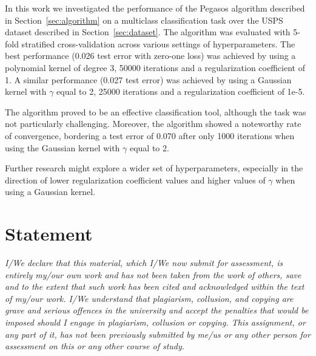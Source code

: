 \documentclass[runningheads]{llncs}
\begin{document}
In this work we investigated the performance of the Pegasos algorithm described in Section~\ref{sec:algorithm} on a multiclass classification task over the USPS dataset described in Section~\ref{sec:dataset}. The algorithm was evaluated with 5-fold stratified cross-validation across various settings of hyperparameters. The best performance (0.026 test error with zero-one loss) was achieved by using a polynomial kernel of degree 3, 50000 iterations and a regularization coefficient of 1. A similar performance (0.027 test error) was achieved by using a Gaussian kernel with $\gamma$ equal to 2, 25000 iterations and a regularization coefficient of 1e-5.

The algorithm proved to be an effective classification tool, although the task was not particularly challenging. Moreover, the algorithm showed a noteworthy rate of convergence, bordering a test error of 0.070 after only 1000 iterations when using the Gaussian kernel with $\gamma$ equal to 2.

Further research might explore a wider set of hyperparameters, especially in the direction of lower regularization coefficient values and higher values of $\gamma$ when using a Gaussian kernel.

\section*{Statement}
\textit{I/We declare that this material, which I/We now submit for assessment, is entirely my/our own work and has not been taken from the work of others, save and to the extent that such work has been cited and acknowledged within the text of my/our work. I/We understand that plagiarism, collusion, and copying are grave and serious offences in the university and accept the penalties that would be imposed should I engage in plagiarism, collusion or copying. This assignment, or any part of it, has not been previously submitted by me/us or any other person for assessment on this or any other course of study.}



\end{document}
